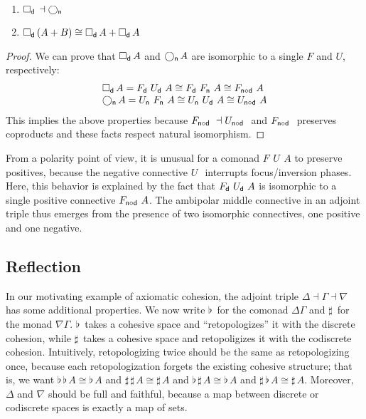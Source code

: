 \documentclass{drl-common/llncs}
\newcommand{\la}{\ensuremath{\dashv}}
\newcommand\compo[2]{\ensuremath{#1 \circ #2}}
\newcommand\F[2]{\ensuremath{F_{#1} \,\, #2}}
\newcommand\U[2]{\ensuremath{U_{#1} \,\, #2}}
\newcommand\coprd[2]{\ensuremath{#1 + #2}}
\newcommand\Bx[2]{\ensuremath{\Box_{#1} \, {#2}}}
\newcommand\Crc[2]{\ensuremath{\bigcirc_{#1} \, {#2}}}
\newcommand\Flat[1]{\ensuremath{\flat \, {#1}}}
\newcommand\Sharp[1]{\ensuremath{\sharp \, {#1}}}
\newcommand\iso{\cong}
\begin{document}
\begin{theorem} \label{thm:adjointtriple}
\begin{enumerate}
\item $\Bx{\dsd{d}}{} \la \Crc{\dsd{n}}{}$ 
\item $\Bx{\dsd{d}}{(\coprd A B)} \iso \coprd{\Bx{\dsd{d}}{A}}{\Bx{\dsd{d}}{A}}$
\end{enumerate}
\end{theorem}

\begin{proof}
We can prove that \Bx{\dsd d}{A} and \Crc{\dsd n}{A} are isomorphic to a
single $F$ and $U$, respectively:
\[
\begin{array}{l}
\Bx{\dsd d}{A} = \F{\dsd{d}}{\U{\dsd d}{A}} \cong \F{\dsd d}{\F{\dsd n}{A}} \cong \F{\compo{\dsd{n}}{\dsd{d}}}{A}\\
\Crc{\dsd{n}}{A} = \U{\dsd{n}}{\F{\dsd n}{A}} \cong \U{\dsd n}{\U{\dsd d}{A}} \cong \U{\compo{\dsd{n}}{\dsd d}}{A}
\end{array}
\]
This implies the above properties because
$\F{\compo{\dsd{n}}{\dsd{d}}}{} \la \U{\compo{\dsd{n}}{\dsd d}}{}$ and
$\F{\compo{\dsd{n}}{\dsd{d}}}$ preserves coproducts and these facts
respect natural isomorphism.
\end{proof}

From a polarity point of view, it is unusual for a comonad
$\F{}{\U{}{A}}$ to preserve positives, because the negative connective
$\U{}{}$ interrupts focus/inversion phases.  Here, this behavior is
explained by the fact that $\F{\dsd{d}}{\U{\dsd{d}}{A}}$ is isomorphic
to a single positive connective $\F{\compo{\dsd n}{\dsd d}}{A}$.  The
ambipolar middle connective in an adjoint triple thus emerges
from the presence of two isomorphic connectives, one positive and one
negative.

\subsection{Reflection}

In our motivating example of axiomatic cohesion, the adjoint triple
$\Delta \la \Gamma \la \nabla$ has some additional properties.  We now
write $\Flat{}$ for the comonad $\Delta\Gamma$ and $\Sharp{}$ for the
monad $\nabla\Gamma$. $\Flat{}$ takes a cohesive space and
``retopologizes'' it with the discrete cohesion, while $\Sharp{}$ takes
a cohesive space and retopoligizes it with the codiscrete cohesion.
Intuitively, retopologizing twice should be the same as retopologizing
once, because each retopologization forgets the existing cohesive
structure; that is, we want $\Flat{\Flat{A}} \iso \Flat A$ and
$\Sharp{\Sharp{A}} \iso \Sharp A$ and $\Flat{\Sharp{A}} \iso \Flat A$ and
$\Sharp{\Flat{A}} \iso \Sharp A$.  Moreover, $\Delta$ and $\nabla$ should
be full and faithful, because a map between discrete or codiscrete
spaces is exactly a map of sets.
\end{document}
